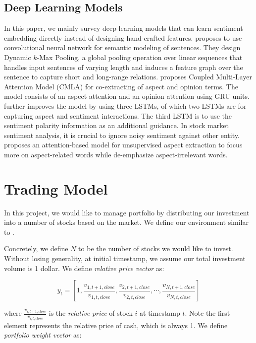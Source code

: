 \documentclass[11pt,a4paper]{article}
\begin{document}
\subsection{Deep Learning Models}
In this paper, we mainly survey deep learning models that can learn sentiment embedding directly instead of designing hand-crafted features. \cite{cnn_model_sentence} proposes to use convolutional neural network for semantic modeling of sentences. They design Dynamic $k$-Max Pooling, a global pooling operation over linear sequences that handles input sentences of varying length and induces a feature graph over the sentence to capture short and long-range relations. \cite{Wang2017CoupledMA} proposes Coupled Multi-Layer Attention Model (CMLA) for co-extracting of aspect and opinion terms. The model consists of an aspect attention and an opinion attention using GRU units. \cite{multi-task_aspect_term} further improves the model by using three LSTMs, of which two LSTMs are for capturing aspect and sentiment interactions. The third LSTM is to use the sentiment polarity information as an additional guidance. In stock market sentiment analysis, it is crucial to ignore noisy sentiment against other entity. \cite{unsupervised_attention_model_aspect} proposes an attention-based model for unsupervised aspect extraction to focus more on aspect-related words while de-emphasize aspect-irrelevant words.


\section{Trading Model}
In this project, we would like to manage portfolio by distributing our investment into a number of stocks based on the market. We define our environment similar to \cite{drl_portfolio_management}.

Concretely, we define $N$ to be the number of stocks we would like to invest.
Without losing generality, at initial timestamp, we assume our total investment volume is 1 dollar. We define \textit{relative price vector} as:

\begin{equation}
y_t=[1, \frac{v_{1,t+1, close}}{v_{1,t, close}}, \frac{v_{2,t+1, close}}{v_{2,t, close}},\cdots,\frac{v_{N,t+1,close}}{v_{N,t, close}}]
\end{equation}

where $\frac{v_{i, t+1, close}}{v_{i, t, close}}$ is the \textit{relative price} of stock $i$ at timestamp $t$. 
Note the first element represents the relative price of cash, which is always 1. We define \textit{portfolio weight vector} as:
\end{document}
